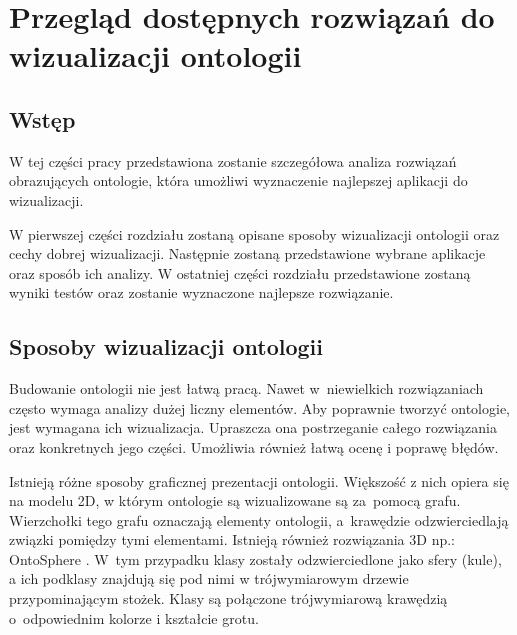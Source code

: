 
\chapter{Przegląd dostępnych rozwiązań do wizualizacji ontologii}
\section{Wstęp}
W tej części pracy przedstawiona zostanie szczegółowa analiza rozwiązań obrazujących ontologie, która umożliwi wyznaczenie najlepszej aplikacji
 do wizualizacji.
\par   W pierwszej części rozdziału zostaną opisane sposoby wizualizacji ontologii oraz cechy dobrej wizualizacji. Następnie zostaną przedstawione 
wybrane aplikacje oraz sposób ich analizy. W ostatniej części rozdziału przedstawione zostaną wyniki testów oraz zostanie wyznaczone najlepsze rozwiązanie. 
\section{Sposoby wizualizacji ontologii}
Budowanie ontologii nie jest łatwą pracą. Nawet w~niewielkich rozwiązaniach często wymaga analizy dużej liczny elementów. 
Aby poprawnie tworzyć ontologie, jest wymagana  ich wizualizacja. Upraszcza ona postrzeganie całego rozwiązania oraz konkretnych jego części.
 Umożliwia również łatwą ocenę i poprawę błędów. 
\par
Istnieją różne sposoby graficznej prezentacji ontologii. Większość 
z nich opiera się na modelu 2D, w którym  ontologie są wizualizowane są za~pomocą grafu. Wierzchołki tego grafu 
oznaczają elementy ontologii, a~krawędzie odzwierciedlają związki pomiędzy tymi elementami. Istnieją również rozwiązania 3D np.: OntoSphere \cite{OntoSphere}. W~tym przypadku klasy zostały odzwierciedlone
 jako sfery (kule), a ich podklasy znajdują się pod nimi w trójwymiarowym drzewie przypominającym stożek. Klasy są połączone trójwymiarową krawędzią 
o~odpowiednim kolorze i kształcie grotu. 
